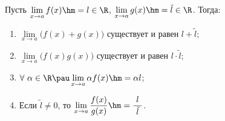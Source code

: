 
Пусть $\lim\limits_{x\to a}f(x)\hm=l\in\R$, $\lim\limits_{x\to a}g(x)\hm=\tilde l\in\R$. Тогда:

\begin{enumerate}
    \item $\lim\limits_{x\to a}\big(f(x)+g(x)\big)$ существует и равен $l+\tilde l$;

    \item $\lim\limits_{x\to a}\big(f(x)g(x)\big)$ существует и равен $l\cdot\tilde l$;

    \item $\forall\  \alpha\in\R\pau \lim\limits_{x\to a}\alpha f(x)\hm=\alpha l$;

    \item Если $\tilde l\neq 0$, то $\lim\limits_{x\to a}\dfrac{f(x)}{g(x)}\hm=\dfrac{\ l\ }{\tilde l}$.
\end{enumerate}
